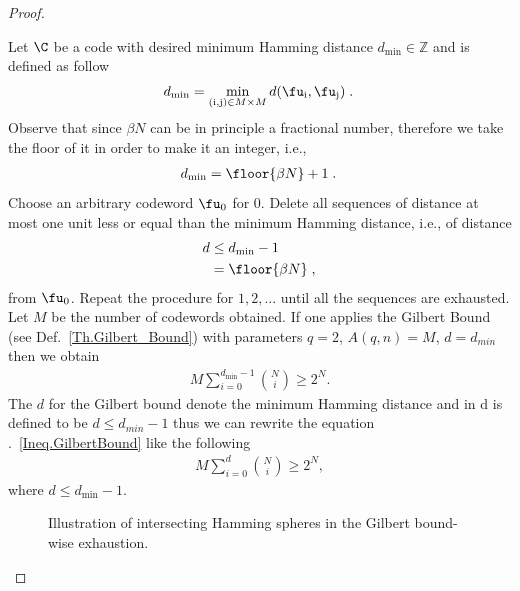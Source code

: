 \begin{proof}

\begin{remark}
Let $\C$ be a code with desired minimum Hamming distance $d_{\text{min}} \in \mathbb{Z}$ and is defined as follow
\begin{align}
    d_{\text{min}} = \underset{(\text{i},\text{j}) \in M \times M}{\min} \, d(\fu_\text{i},\fu_\text{j}) \;.\,
\end{align}
Observe that since $\beta N$ can be in principle a fractional number, therefore we take the floor of it in order to make it an integer, i.e.,
\begin{align}
    d_{\text{min}} = \floor{\beta N} + 1 \;.\,
\end{align}
Choose an arbitrary codeword $\fu_0$ for $0$. Delete all sequences of distance at most one unit less or equal than the minimum Hamming distance, i.e., of distance
\begin{align}
    d & \leq d_{\text{min}} - 1
    \nonumber\\
    & = \floor{\beta N}
    \;,\,
\end{align}
from $\fu_0$. Repeat the procedure for $1,2,...$ until all the sequences are exhausted. Let $M$ be the number of codewords obtained.\newline
If one applies the Gilbert Bound (see Def.~\ref{Th.Gilbert_Bound}) with parameters $q=2$, $A(q,n) = M$, $d=d_{min}$ then we obtain 
\begin{align}
    \label{Ineq.GilbertBound}
    M \sum_{i=0}^{d_{\text{min}}-1} \binom{N}{i} \geq 2^N.
\end{align}
The $d$ for the Gilbert bound denote the minimum Hamming distance and in \cite{J85} d is defined to be $d \leq d_{min}-1$ thus we can rewrite the equation .~\eqref{Ineq.GilbertBound} like the following 
\begin{align}
\label{Eq.GB2}
    M \sum_{i=0}^{d} \binom{N}{i} \geq 2^N,
\end{align}
where $d \leq  d_{\text{min}}-1$.
\end{remark}
\begin{figure}[H]
    \centering
    
    \vspace{4mm}
    \caption{Illustration of intersecting Hamming spheres in the Gilbert bound-wise exhaustion.}
    \label{fig:my_label}
\end{figure}

\end{proof}
